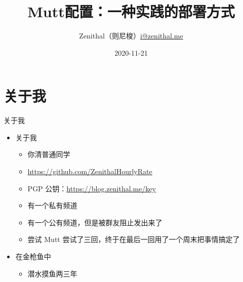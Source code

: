 \documentclass{ctexbeamer}
\title{Mutt配置：一种实践的部署方式}
\author[Zenithal（则尼梭）]{Zenithal（则尼梭）\newline\url{i@zenithal.me}}
\date{2020-11-21}
\newcommand{\T}[1]{\texttt{#1}}
\begin{document}
\begin{frame}
\maketitle
\end{frame}

\section{关于我}
\begin{frame}{关于我}
  \begin{itemize}
    \item 关于我\begin{itemize}
        \item 你清普通同学
        \item \url{https://github.com/ZenithalHourlyRate}
        \item PGP 公钥：\url{https://blog.zenithal.me/key}
        \item 有一个私有频道%
        \item 有一个公有频道，但是被群友阻止发出来了%
        \item 尝试 Mutt 尝试了三回，终于在最后一回用了一个周末把事情搞定了
      \end{itemize}
    \item 在金枪鱼中\begin{itemize}
        \item 潜水摸鱼两三年
    \end{itemize}
  \end{itemize}
\end{frame}
\end{document}
